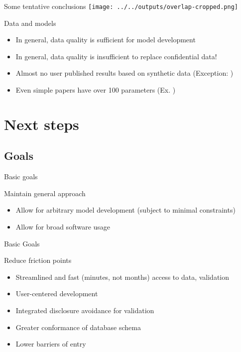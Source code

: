 \begin{frame}{Some tentative conclusions}
\texttt{[image: ../../outputs/overlap-cropped.png]}
\begin{block}{Data and models}
\begin{itemize}
    \item In general, data quality is sufficient for model development
    \item In general, data quality is insufficient to replace confidential data!
    \item Almost no user published results based on synthetic data {\tiny (Exception: \citet{perla2021})}
    \item Even simple papers have over 100 parameters {\tiny (Ex. \citet{10.1257/pandp.20181050})}
\end{itemize}
\end{block}
    
\end{frame}



\section{Next steps}

\subsection{Goals}


\begin{frame}{Basic goals}
\begin{block}{Maintain general approach}
    \begin{itemize}
        \item Allow for arbitrary model development (subject to minimal constraints)
        \item Allow for broad software usage
    \end{itemize}
\end{block} 
\end{frame}

\begin{frame}{Basic Goals}
\begin{block}{Reduce  friction points}
    \begin{itemize}
        \item Streamlined and fast (minutes, not months) access to data, validation
        \item User-centered  development
        \item Integrated disclosure avoidance for validation
        \item Greater conformance of database schema
        \item Lower barriers of entry
    \end{itemize}
\end{block}
\end{frame}


